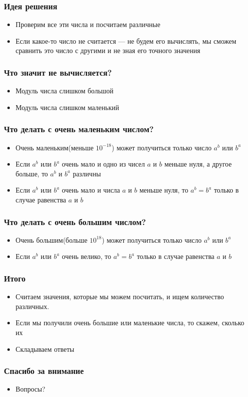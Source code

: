 \begin{frame}
  \frametitle{Идея решения}
  \begin{itemize}
    \item Проверим все эти числа и посчитаем различные
    \item Если какое-то число не считается --- не будем его вычислять, мы сможем сравнить это число с другими и не зная его точного значения
  \end{itemize}
\end{frame}

\begin{frame}
  \frametitle{Что значит не вычисляется?}
  \begin{itemize}
    \item Модуль числа слишком большой
    \item Модуль числа слишком маленький
  \end{itemize}
\end{frame}

\begin{frame}
  \frametitle{Что делать с очень маленьким числом?}
  \begin{itemize}
    \item Очень маленьким(меньше $10^{-18}$) может получиться только число $a ^ b$ или $b ^ a$
    \item Если $a ^ b$ или $b ^ a$ очень мало и одно из чисел $a$ и $b$ меньше нуля, а другое больше, то $a ^ b$ и $b ^ a$ различны
    \item Если $a ^ b$ или $b ^ a$ очень мало и числа $a$ и $b$ меньше нуля, то $a ^ b = b ^ a$ только в случае равенства $a$ и $b$
  \end{itemize}
\end{frame}

\begin{frame}
  \frametitle{Что делать с очень большим числом?}
  \begin{itemize}
    \item Очень большим(больше $10^{18}$) может получиться только число $a ^ b$ или $b ^ a$
    \item Если $a ^ b$ или $b ^ a$ очень велико, то $a ^ b = b ^ a$ только в случае равенства $a$ и $b$
  \end{itemize}
\end{frame}

\begin{frame}
  \frametitle{Итого}
  \begin{itemize}
    \item Считаем значения, которые мы можем посчитать, и ищем количество различных.
    \item Если мы получили очень большие или маленькие числа, то скажем, сколько их
    \item Складываем ответы
  \end{itemize}
\end{frame}

\begin{frame}
  \frametitle{Спасибо за внимание}
  \begin{itemize}
    \item Вопросы?
  \end{itemize}
\end{frame}

